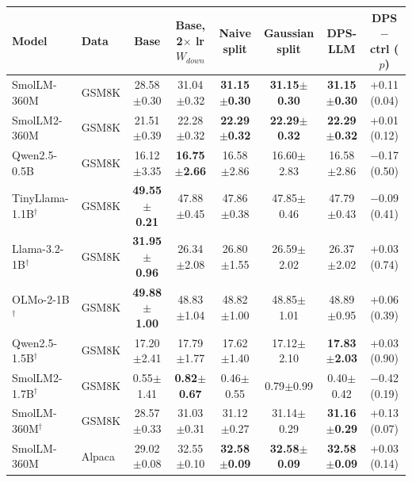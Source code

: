 \begin{tabular}{@{}llcccccc@{}}
\toprule
\textbf{Model} & \textbf{Data} & \textbf{Base} & \textbf{Base, 2$\times$ lr $W_{down}$} & \textbf{Naive split} & \textbf{Gaussian split} & \textbf{DPS-LLM} & \textbf{DPS $-$ ctrl ($p$)} \\
\midrule
SmolLM-360M & GSM8K & 28.58{\scriptsize$\pm$0.30} & 31.04{\scriptsize$\pm$0.32} & \textbf{31.15{\scriptsize$\pm$0.30}} & \textbf{31.15{\scriptsize$\pm$0.30}} & \textbf{31.15{\scriptsize$\pm$0.30}} & +0.11 (0.04) \\
SmolLM2-360M & GSM8K & 21.51{\scriptsize$\pm$0.39} & 22.28{\scriptsize$\pm$0.32} & \textbf{22.29{\scriptsize$\pm$0.32}} & \textbf{22.29{\scriptsize$\pm$0.32}} & \textbf{22.29{\scriptsize$\pm$0.32}} & +0.01 (0.12) \\
Qwen2.5-0.5B & GSM8K & 16.12{\scriptsize$\pm$3.35} & \textbf{16.75{\scriptsize$\pm$2.66}} & 16.58{\scriptsize$\pm$2.86} & 16.60{\scriptsize$\pm$2.83} & 16.58{\scriptsize$\pm$2.86} & $-$0.17 (0.50) \\
TinyLlama-1.1B$^\dagger$ & GSM8K & \textbf{49.55{\scriptsize$\pm$0.21}} & 47.88{\scriptsize$\pm$0.45} & 47.86{\scriptsize$\pm$0.38} & 47.85{\scriptsize$\pm$0.46} & 47.79{\scriptsize$\pm$0.43} & $-$0.09 (0.41) \\
Llama-3.2-1B$^\dagger$ & GSM8K & \textbf{31.95{\scriptsize$\pm$0.96}} & 26.34{\scriptsize$\pm$2.08} & 26.80{\scriptsize$\pm$1.55} & 26.59{\scriptsize$\pm$2.02} & 26.37{\scriptsize$\pm$2.02} & +0.03 (0.74) \\
OLMo-2-1B$^\dagger$ & GSM8K & \textbf{49.88{\scriptsize$\pm$1.00}} & 48.83{\scriptsize$\pm$1.04} & 48.82{\scriptsize$\pm$1.00} & 48.85{\scriptsize$\pm$1.01} & 48.89{\scriptsize$\pm$0.95} & +0.06 (0.39) \\
Qwen2.5-1.5B$^\dagger$ & GSM8K & 17.20{\scriptsize$\pm$2.41} & 17.79{\scriptsize$\pm$1.77} & 17.62{\scriptsize$\pm$1.40} & 17.12{\scriptsize$\pm$2.10} & \textbf{17.83{\scriptsize$\pm$2.03}} & +0.03 (0.90) \\
SmolLM2-1.7B$^\dagger$ & GSM8K & 0.55{\scriptsize$\pm$1.41} & \textbf{0.82{\scriptsize$\pm$0.67}} & 0.46{\scriptsize$\pm$0.55} & 0.79{\scriptsize$\pm$0.99} & 0.40{\scriptsize$\pm$0.42} & $-$0.42 (0.19) \\
SmolLM-360M$^\dagger$ & GSM8K & 28.57{\scriptsize$\pm$0.33} & 31.03{\scriptsize$\pm$0.31} & 31.12{\scriptsize$\pm$0.27} & 31.14{\scriptsize$\pm$0.29} & \textbf{31.16{\scriptsize$\pm$0.29}} & +0.13 (0.07) \\
\midrule
SmolLM-360M & Alpaca & 29.02{\scriptsize$\pm$0.08} & 32.55{\scriptsize$\pm$0.10} & \textbf{32.58{\scriptsize$\pm$0.09}} & \textbf{32.58{\scriptsize$\pm$0.09}} & \textbf{32.58{\scriptsize$\pm$0.09}} & +0.03 (0.14) \\

\end{tabular}

